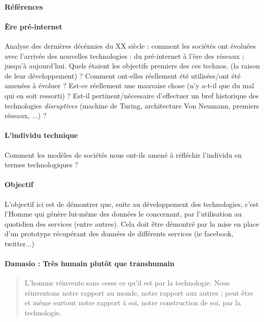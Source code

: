 \paragraph{Références} \cite{Marx0} \cite{Marx1} \cite{Nietzsche0}

\paragraph{Ère pré-internet} Analyse des dernières décénnies du XX siècle :
comment les sociétés ont évoluées avec l'arrivée des nouvelles technologies : du
pré-internet à l'ère des réseaux ; jusqu'à aujourd'hui. Quels étaient les objectifs
premiers des ces technos. (la raison de leur développement) ? Comment ont-elles réellement
été utilisées/ont été amenées à évoluer ? Est-ce réellement une mauvaise chose (n'y
a-t-il que du mal qui en soit ressorti) ? Est-il pertinent/nécessaire d'effectuer un bref
historique des technologies \emph{disruptives} (machine de Turing, architecture
Von Neumann, premiers réseaux, ...) ?

\paragraph{L'individu technique} Comment les modèles de sociétés nous ont-ils amené à
réfléchir l'individu en termes technologiques ?

\paragraph{Objectif} L'objectif ici est de démontrer que, suite au développement des technologies, c'est l'Homme
qui génère lui-même des données le concernant, par l'utilisation au quotidien des services (entre autres).
Cela doit être démontré par la mise en place d'un prototype récupérant des données de différents
services (ie facebook, twitter...)

\paragraph{Damasio : Très humain plutôt que transhumain}

\begin{quotation}
    L'homme réinvente sans cesse ce qu'il est par la technologie. Nous réinventons notre
    rapport au monde, notre rapport aux autres ; peut être et même surtout notre rapport à soi, 
    notre construction de soi, par la technologie. \cite{Damasio2}
\end{quotation}

